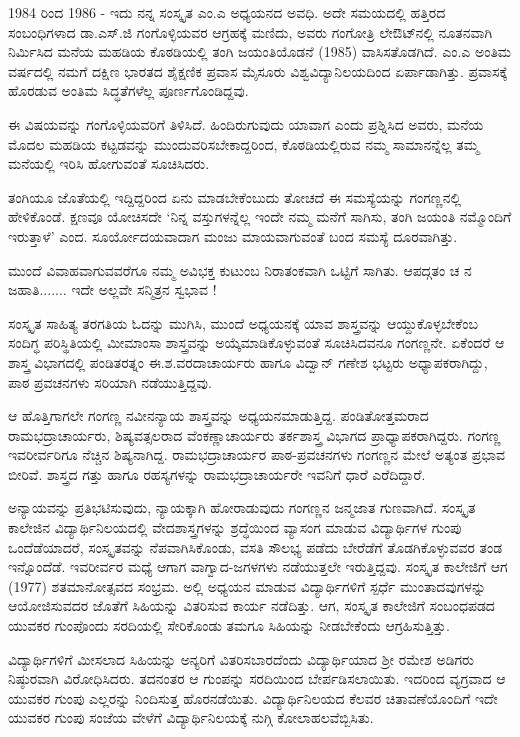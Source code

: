 1984 ರಿಂದ 1986 - ಇದು ನನ್ನ ಸಂಸ್ಕೃತ ಎಂ.ಎ ಅಧ್ಯಯನದ ಅವಧಿ. ಅದೇ ಸಮಯದಲ್ಲಿ ಹತ್ತಿರದ ಸಂಬಂಧಿಗಳಾದ ಡಾ.ಎಸ್.ಜಿ ಗಂಗೊಳ್ಳಿಯವರ ಆಗ್ರಹಕ್ಕೆ ಮಣಿದು, ಅವರು ಗಂಗೋತ್ರಿ ಲೇಔಟ್‍ನಲ್ಲಿ ನೂತನವಾಗಿ ನಿರ್ಮಿಸಿದ ಮನೆಯ ಮಹಡಿಯ ಕೊಠಡಿಯಲ್ಲಿ ತಂಗಿ ಜಯಂತಿಯೊಡನೆ (1985) ವಾಸಿಸತೊಡಗಿದೆ. ಎಂ.ಎ ಅಂತಿಮ ವರ್ಷದಲ್ಲಿ ನಮಗೆ ದಕ್ಷಿಣ  ಭಾರತದ ಶೈಕ್ಷಣಿಕ ಪ್ರವಾಸ ಮೈಸೂರು ವಿಶ್ವವಿದ್ಯಾನಿಲಯದಿಂದ ಏರ್ಪಾಡಾಗಿತ್ತು. ಪ್ರವಾಸಕ್ಕೆ ಹೊರಡುವ ಅಂತಿಮ ಸಿದ್ಧತೆಗಳೆಲ್ಲ ಪೂರ್ಣಗೊಂಡಿದ್ದವು.

ಈ ವಿಷಯವನ್ನು ಗಂಗೊಳ್ಳಿಯವರಿಗೆ ತಿಳಿಸಿದೆ.  ಹಿಂದಿರುಗುವುದು ಯಾವಾಗ ಎಂದು ಪ್ರಶ್ನಿಸಿದ ಅವರು, ಮನೆಯ ಮೊದಲ ಮಹಡಿಯ ಕಟ್ಟಡವನ್ನು ಮುಂದುವರಿಸಬೇಕಾದ್ದರಿಂದ, ಕೊಠಡಿಯಲ್ಲಿರುವ ನಮ್ಮ ಸಾಮಾನನ್ನೆಲ್ಲ ತಮ್ಮ ಮನೆಯಲ್ಲಿ ಇರಿಸಿ ಹೋಗುವಂತೆ ಸೂಚಿಸಿದರು. 

ತಂಗಿಯೂ ಜೊತೆಯಲ್ಲಿ ಇದ್ದಿದ್ದರಿಂದ ಏನು ಮಾಡಬೇಕೆಂಬುದು ತೋಚದೆ ಈ ಸಮಸ್ಯೆಯನ್ನು ಗಂಗಣ್ಣನಲ್ಲಿ ಹೇಳಿಕೊಂಡೆ. ಕ್ಷಣವೂ ಯೋಚಿಸದೇ ‘ನಿನ್ನ ವಸ್ತುಗಳನ್ನೆಲ್ಲ ಇಂದೇ ನಮ್ಮ ಮನೆಗೆ ಸಾಗಿಸು, ತಂಗಿ ಜಯಂತಿ ನಮ್ಮೊಂದಿಗೆ ಇರುತ್ತಾಳೆ’ ಎಂದ. ಸೂರ್ಯೋದಯವಾದಾಗ ಮಂಜು ಮಾಯವಾಗುವಂತೆ ಬಂದ ಸಮಸ್ಯೆ ದೂರವಾಗಿತ್ತು. 

ಮುಂದೆ ವಿವಾಹವಾಗುವವರೆಗೂ ನಮ್ಮ ಅವಿಭಕ್ತ ಕುಟುಂಬ ನಿರಾತಂಕವಾಗಿ ಒಟ್ಟಿಗೆ ಸಾಗಿತು. ಆಪದ್ಗತಂ ಚ ನ ಜಹಾತಿ....... ಇದೇ ಅಲ್ಲವೇ ಸನ್ಮಿತ್ರನ ಸ್ವಭಾವ ! 

ಸಂಸ್ಕೃತ ಸಾಹಿತ್ಯ ತರಗತಿಯ ಓದನ್ನು ಮುಗಿಸಿ, ಮುಂದೆ ಅಧ್ಯಯನಕ್ಕೆ ಯಾವ ಶಾಸ್ತ್ರವನ್ನು ಆಯ್ದುಕೊಳ್ಳಬೇಕೆಂಬ ಸಂದಿಗ್ಧ ಪರಿಸ್ಥಿತಿಯಲ್ಲಿ  ಮೀಮಾಂಸಾ ಶಾಸ್ತ್ರವನ್ನು  ಅಯ್ಕೆಮಾಡಿಕೊಳ್ಳುವಂತೆ ಸೂಚಿಸಿದವನೂ ಗಂಗಣ್ಣನೇ. ಏಕೆಂದರೆ ಆ ಶಾಸ್ತ್ರ ವಿಭಾಗದಲ್ಲಿ ಪಂಡಿತರತ್ನಂ ಈ.ಶ.ವರದಾಚಾರ್ಯರು ಹಾಗೂ ವಿದ್ವಾನ್ ಗಣೇಶ ಭಟ್ಟರು ಅಧ್ಯಾಪಕರಾಗಿದ್ದು, ಪಾಠ ಪ್ರವಚನಗಳು ಸರಿಯಾಗಿ ನಡೆಯುತ್ತಿದ್ದವು.

ಆ ಹೊತ್ತಿಗಾಗಲೇ ಗಂಗಣ್ಣ ನವೀನನ್ಯಾಯ ಶಾಸ್ತ್ರವನ್ನು ಅಧ್ಯಯನಮಾಡುತ್ತಿದ್ದ. ಪಂಡಿತೋತ್ತಮರಾದ ರಾಮಭದ್ರಾಚಾರ್ಯರು, ಶಿಷ್ಯವತ್ಸಲರಾದ ವೆಂಕಣ್ಣಾಚಾರ್ಯರು ತರ್ಕಶಾಸ್ತ್ರ ವಿಭಾಗದ ಪ್ರಾಧ್ಯಾಪಕರಾಗಿದ್ದರು. ಗಂಗಣ್ಣ ಇವರೀರ್ವರಿಗೂ ನೆಚ್ಚಿನ ಶಿಷ್ಯನಾಗಿದ್ದ. ರಾಮಭದ್ರಾಚಾರ್ಯರ ಪಾಠ-ಪ್ರವಚನಗಳು ಗಂಗಣ್ಣನ ಮೇಲೆ ಅತ್ಯಂತ ಪ್ರಭಾವ ಬೀರಿವೆ. ಶಾಸ್ತ್ರದ ಗತ್ತು ಹಾಗೂ ರಹಸ್ಯಗಳನ್ನು ರಾಮಭದ್ರಾಚಾರ್ಯರೇ ಇವನಿಗೆ ಧಾರೆ ಎರೆದಿದ್ದಾರೆ.

ಅನ್ಯಾಯವನ್ನು ಪ್ರತಿಭಟಿಸುವುದು, ನ್ಯಾಯಕ್ಕಾಗಿ ಹೋರಾಡುವುದು ಗಂಗಣ್ಣನ ಜನ್ಮಜಾತ ಗುಣವಾಗಿದೆ. ಸಂಸ್ಕೃತ ಕಾಲೇಜಿನ ವಿದ್ಯಾರ್ಥಿನಿಲಯದಲ್ಲಿ ವೇದಶಾಸ್ತ್ರಗಳನ್ನು ಶ್ರದ್ಧೆಯಿಂದ ವ್ಯಾಸಂಗ ಮಾಡುವ ವಿದ್ಯಾರ್ಥಿಗಳ ಗುಂಪು ಒಂದೆಡೆಯಾದರೆ, ಸಂಸ್ಕೃತವನ್ನು ನೆಪವಾಗಿಸಿಕೊಂಡು, ವಸತಿ ಸೌಲಭ್ಯ ಪಡೆದು ಬೇರೆಡೆಗೆ ತೊಡಗಿಕೊಳ್ಳುವವರ ತಂಡ ಇನ್ನೊಂದೆಡೆ. ಇವರೀರ್ವರ ಮಧ್ಯೆ ಆಗಾಗ ವಾಗ್ವಾದ-ಜಗಳಗಳು ನಡೆಯುತ್ತಲೇ ಇರುತ್ತಿದ್ದವು. ಸಂಸ್ಕೃತ ಕಾಲೇಜಿಗೆ ಆಗ (1977) ಶತಮಾನೋತ್ಸವದ ಸಂಭ್ರಮ. ಅಲ್ಲಿ ಅಧ್ಯಯನ ಮಾಡುವ ವಿದ್ಯಾರ್ಥಿಗಳಿಗೆ ಸ್ಪರ್ಧೆ ಮುಂತಾದವುಗಳನ್ನು ಆಯೋಜಿಸುವದರ ಜೊತೆಗೆ ಸಿಹಿಯನ್ನು ವಿತರಿಸುವ ಕಾರ್ಯ ನಡೆದಿತ್ತು. ಆಗ, ಸಂಸ್ಕೃತ ಕಾಲೇಜಿಗೆ ಸಂಬಂಧಪಡದ ಯುವಕರ ಗುಂಪೊಂದು ಸರದಿಯಲ್ಲಿ ಸೇರಿಕೊಂಡು ತಮಗೂ ಸಿಹಿಯನ್ನು ನೀಡಬೇಕೆಂದು ಆಗ್ರಹಿಸುತ್ತಿತ್ತು.

ವಿದ್ಯಾರ್ಥಿಗಳಿಗೆ ಮೀಸಲಾದ ಸಿಹಿಯನ್ನು ಅನ್ಯರಿಗೆ ವಿತರಿಸಬಾರದೆಂದು ವಿದ್ಯಾರ್ಥಿಯಾದ ಶ್ರೀ ರಮೇಶ ಅಡಿಗರು ನಿಷ್ಠುರವಾಗಿ ವಿರೋಧಿಸಿದರು. ತದನಂತರ ಆ ಗುಂಪನ್ನು ಸರದಿಯಿಂದ ಬೇರ್ಪಡಿಸಲಾಯಿತು. ಇದರಿಂದ ವ್ಯಗ್ರವಾದ ಆ ಯುವಕರ ಗುಂಪು ಎಲ್ಲರನ್ನು ನಿಂದಿಸುತ್ತ ಹೊರನಡೆಯಿತು. ವಿದ್ಯಾರ್ಥಿನಿಲಯದ ಕೆಲವರ ಚಿತಾವಣೆಯೊಂದಿಗೆ ಇದೇ ಯುವಕರ ಗುಂಪು ಸಂಜೆಯ ವೇಳೆಗೆ ವಿದ್ಯಾರ್ಥಿನಿಲಯಕ್ಕೆ ನುಗ್ಗಿ ಕೋಲಾಹಲವೆಬ್ಬಿಸಿತು. 

